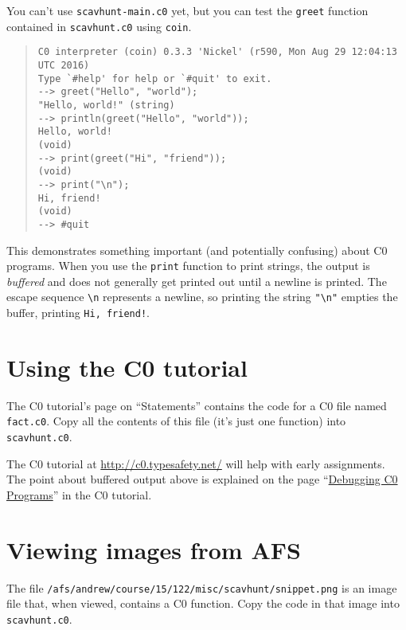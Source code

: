 \documentclass[12pt]{exam}
\begin{document}
You can't use \lstinline'scavhunt-main.c0' yet, but you can test the
\lstinline'greet' function contained in \lstinline'scavhunt.c0' using
\lstinline'coin'.

\begin{quote}
\begin{lstlisting}[language={[coin]C},lastline=13]
% coin -d scavhunt.c0
C0 interpreter (coin) 0.3.3 'Nickel' (r590, Mon Aug 29 12:04:13 UTC 2016)
Type `#help' for help or `#quit' to exit.
--> greet("Hello", "world");
"Hello, world!" (string)
--> println(greet("Hello", "world"));
Hello, world!
(void)
--> print(greet("Hi", "friend"));
(void)
--> print("\n");
Hi, friend!
(void)
--> #quit
\end{lstlisting}
\end{quote}

This demonstrates something important (and potentially confusing)
about C0 programs. When you use the \lstinline'print' function to
print strings, the output is \emph{buffered} and does not generally
get printed out until a newline is printed. The escape sequence
\lstinline'\n' represents a newline, so printing the string
\lstinline'"\n"' empties the buffer, printing \lstinline'Hi, friend!'.


\section{Using the C0 tutorial}

\vspace{-\bigskipamount}
\begin{task}[2]
The C0 tutorial's page on ``Statements'' contains the code for a C0
file named \lstinline'fact.c0'. Copy all the contents of this file (it's
just one function) into \lstinline'scavhunt.c0'.
\end{task}

The C0 tutorial at \url{http://c0.typesafety.net/} will help with
early assignments. The point about buffered output above is explained
on the page ``\href{http://c0.typesafety.net/tutorial/Debugging-C0-Programs.html}{Debugging C0 Programs}'' in the C0 tutorial.


\section{Viewing images from AFS}

\vspace{-\bigskipamount}
\begin{task}[2]
The file
\lstinline'/afs/andrew/course/15/122/misc/scavhunt/snippet.png' is an image
file that, when viewed, contains a C0 function. Copy the code in that image
into \lstinline'scavhunt.c0'.
\end{task}
\end{document}
